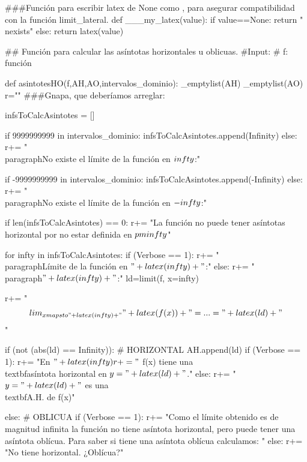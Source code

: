 \begin{sagesilent}
###Función para escribir latex de None como \nexists, para asegurar compatibilidad con la función limit_lateral.
def ___my_latex(value):
    if value==None:
        return "\\nexists"
    else:
        return latex(value)

## Función para calcular las asíntotas horizontales u oblicuas.
#Input:
# f: función

def asintotesHO(f,AH,AO,intervalos_dominio):
    _emptylist(AH)
    _emptylist(AO)
    r=""
    ###Gnapa, que deberíamos arreglar:

    infsToCalcAsintotes = []

    if 9999999999 in intervalos_dominio:
        infsToCalcAsintotes.append(Infinity)
    else:
        r+= "\\paragraph{No existe el límite de la función en $\\infty$:}"

    if -9999999999 in intervalos_dominio:
        infsToCalcAsintotes.append(-Infinity)
    else:
        r+= "\\paragraph{No existe el límite de la función en $-\\infty$:}"

        
    if len(infsToCalcAsintotes) == 0:
        r+= "La función no puede tener asíntotas horizontal por no estar definida en $\\pm\\infty$"
    
    for infty in infsToCalcAsintotes:
        if (Verbose == 1):
            r+= "\\paragraph{Límite de la función en $"+latex(infty)+"$:}"
        else:
            r+= "\\paragraph{$"+latex(infty)+"$:}"
        ld=limit(f, x=infty)  

        r+= "\[\\lim_{x\\mapsto "+latex(infty)+"}" + latex(f(x)) + "= ... = "+latex(ld)+"\]"    

        if (not (abs(ld) == Infinity)): # HORIZONTAL
            AH.append(ld)
            if (Verbose == 1):
                r+= "En $"+latex(infty)
                r+= "$ f(x) tiene una \\textbf{asíntota horizontal} en $y = "+latex(ld)+"$."
            else:
                r+= "$y = "+latex(ld) +" $ es una \\textbf{A.H.} de f(x)"

        else: # OBLICUA
            if (Verbose == 1):
                r+= "Como el límite obtenido es de magnitud infinita la función no tiene asíntota horizontal, pero puede tener una asíntota oblícua. Para saber si tiene una asíntota oblícua calculamos: "
            else:
                r+= "No tiene horizontal. ¿Oblícua?"


\end{sagesilent}
